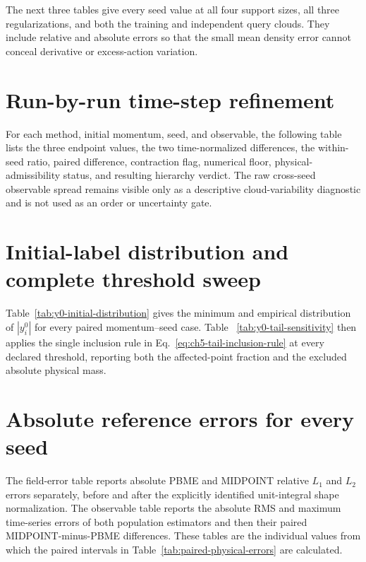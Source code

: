 \documentclass[
  11pt,
  letterpaper,
  onehalfspacing,
  normalmargins,
  equalmargins,
  oneside
]{ut-thesis}
\begin{document}
The next three tables give every seed value at all four support sizes, all
three regularizations, and both the training and independent query clouds.
They include relative and absolute errors so that the small mean density error
cannot conceal derivative or excess-action variation.


\section{Run-by-run time-step refinement}

For each method, initial momentum, seed, and observable, the following table
lists the three endpoint values, the two time-normalized differences, the
within-seed ratio, paired difference, contraction flag, numerical floor,
physical-admissibility status, and resulting hierarchy verdict. The raw
cross-seed observable spread remains visible only as a descriptive
cloud-variability diagnostic and is not used as an order or uncertainty gate.


\section{Initial-label distribution and complete threshold sweep}

Table~\ref{tab:y0-initial-distribution} gives the minimum and empirical
distribution of \(|y_i^0|\) for every paired momentum--seed case. Table~
\ref{tab:y0-tail-sensitivity} then applies the single inclusion rule in
Eq.~\eqref{eq:ch5-tail-inclusion-rule} at every declared threshold, reporting
both the affected-point fraction and the excluded absolute physical mass.



\section{Absolute reference errors for every seed}

The field-error table reports absolute PBME and MIDPOINT relative \(L_1\) and
\(L_2\) errors separately, before and after the explicitly identified
unit-integral shape normalization. The observable table reports the absolute
RMS and maximum time-series errors of both population estimators and then
their paired MIDPOINT-minus-PBME differences. These tables are the individual
values from which the paired intervals in
Table~\ref{tab:paired-physical-errors} are calculated.


\end{document}
